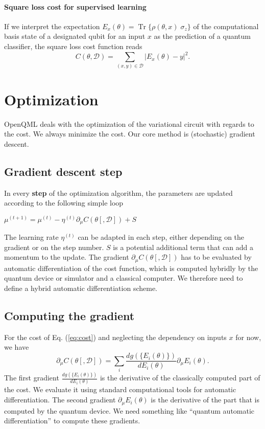 \documentclass[amsmath,amssymb,aps,pra,10pt,twocolumn,groupedaddress,nofootinbib]{revtex4-1}
\DeclareMathOperator{\tr}{Tr}
\begin{document}
\paragraph{Square loss cost for supervised learning}
If we interpret the expectation $E_x(\theta) = \tr \{ \rho(\theta, x)
\; \sigma_z \}$ of the computational basis state of a designated qubit
for an input $x$ as the prediction of a quantum classifier, the square
loss cost function reads
\[ C(\theta, \mathcal{D}) = \sum_{(x,y) \in \mathcal{D}} |E_x(\theta)-y|^2. \]

\color{black}

\section{Optimization}

OpenQML deals with the optimization of the variational circuit with
regards to the cost. We always minimize the cost. Our core method is
(stochastic) gradient descent.

\subsection{Gradient descent step}
In every \textbf{step} of the optimization algorithm, the parameters are updated according to the following simple loop\\

\begin{algorithmic}[1]
\For {$\mu \in \theta $}
\State $\mu^{(t+1)} = \mu^{(t)} - \eta^{(t)} \partial_{\mu} C(\theta[, \mathcal{D}]) + S$
\EndFor
\EndProcedure
\end{algorithmic}

The learning rate $\eta^{(t)}$ can be adapted in each step, either
depending on the gradient or on the step number. $S$ is a potential
additional term that can add a momentum to the update. The gradient
$\partial_{\mu} C(\theta[, \mathcal{D}])$ has to be evaluated by
automatic differentiation of the cost function, which is computed
hybridly by the quantum device or simulator and a classical
computer. We therefore need to define a hybrid automatic
differentiation scheme.

\subsection{Computing the gradient}
For the cost of Eq. (\ref{eq:cost}) and neglecting the dependency on inputs $x$ for now, we have
\[\partial_{\mu} C(\theta[, \mathcal{D}]) = \sum_i \frac{d g(\{E_i(\theta)\})}{d E_i(\theta)} \partial_{\mu} E_i(\theta). \]
The first gradient $\frac{d g(\{E_i(\theta)\})}{d E_i(\theta)}$ is the
derivative of the classically computed part of the cost. We evaluate
it using standard computational tools for automatic
differentiation. The second gradient $\partial_{\mu} E_i(\theta)$ is
the derivative of the part that is computed by the quantum device. We
need something like ``quantum automatic differentiation'' to compute
these gradients.
\end{document}

